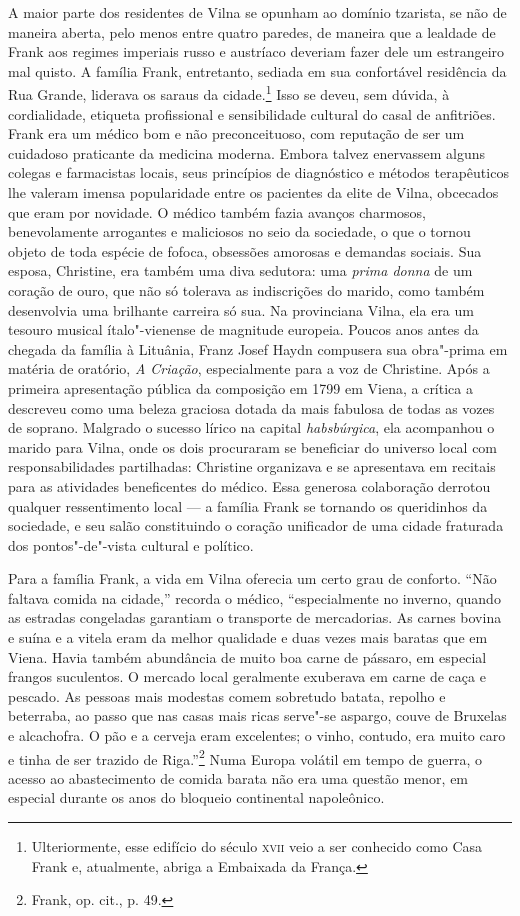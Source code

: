 A maior parte dos residentes de Vilna se opunham ao domínio tzarista, se
não de maneira aberta, pelo menos entre quatro paredes, de maneira que a
lealdade de Frank aos regimes imperiais russo e austríaco deveriam fazer
dele um estrangeiro mal quisto. A família Frank, entretanto, sediada em
sua confortável residência da Rua Grande, liderava os saraus da
cidade.\footnote{Ulteriormente, esse edifício do século \textsc{xvii} veio a ser conhecido como Casa Frank e, atualmente, abriga a Embaixada da França.} Isso se deveu, sem dúvida, à cordialidade, etiqueta profissional e
sensibilidade cultural do casal de anfitriões. Frank era um médico bom e
não preconceituoso, com reputação de ser um cuidadoso praticante da
medicina moderna. Embora talvez enervassem alguns colegas e farmacistas
locais, seus princípios de diagnóstico e métodos terapêuticos lhe
valeram imensa popularidade entre os pacientes da elite de Vilna,
obcecados que eram por novidade. O médico também fazia avanços
charmosos, benevolamente arrogantes e maliciosos no seio da sociedade, o
que o tornou objeto de toda espécie de fofoca, obsessões amorosas e
demandas sociais. Sua esposa, Christine, era também uma diva sedutora:
uma \textit{prima donna} de um coração de ouro, que não só tolerava as
indiscrições do marido, como também desenvolvia uma brilhante carreira
só sua. Na provinciana Vilna, ela era um tesouro musical ítalo"-vienense
de magnitude europeia. Poucos anos antes da chegada da família à
Lituânia, Franz Josef Haydn compusera sua obra"-prima em matéria de
oratório, \textit{A Criação}, especialmente para a voz de Christine. Após
a primeira apresentação pública da composição em 1799 em Viena, a
crítica a descreveu como uma beleza graciosa dotada da mais fabulosa de
todas as vozes de soprano. Malgrado o sucesso lírico na capital
\textit{habsbúrgica}, ela acompanhou o marido para Vilna, onde os dois procuraram
se beneficiar do universo local com responsabilidades partilhadas:
Christine organizava e se apresentava em recitais para as atividades
beneficentes do médico. Essa generosa colaboração derrotou qualquer
ressentimento local --- a família Frank se tornando os queridinhos da
sociedade, e seu salão constituindo o coração unificador de uma cidade
fraturada dos pontos"-de"-vista cultural e político.

Para a família Frank, a vida em Vilna oferecia um certo grau de
conforto. ``Não faltava comida na cidade,'' recorda o médico,
``especialmente no inverno, quando as estradas congeladas garantiam o
transporte de mercadorias. As carnes bovina e suína e a vitela eram da
melhor qualidade e duas vezes mais baratas que em Viena. Havia também
abundância de muito boa carne de pássaro, em especial frangos
suculentos. O mercado local geralmente exuberava em carne de caça e
pescado. As pessoas mais modestas comem sobretudo batata, repolho e
beterraba, ao passo que nas casas mais ricas serve"-se aspargo, couve de
Bruxelas e alcachofra. O pão e a cerveja eram excelentes; o vinho,
contudo, era muito caro e tinha de ser trazido de Riga.''\footnote{Frank, op. cit., p. 49.} Numa Europa volátil em tempo de guerra, o acesso ao abastecimento de comida barata não era uma questão menor, em especial
durante os anos do bloqueio continental napoleônico.


